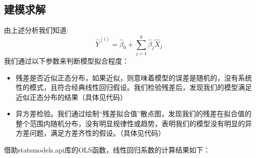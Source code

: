 \documentclass[UTF8, zihao=-4]{ctexart}
\begin{document}
	\subsection{建模求解}
		由上述分析我们知道:
		\[
		\hat{Y}^{(i)} = \hat{\beta}_0 + \sum_{j=1}^{8}\hat{\beta}_j\hat{X}_j
		\]
		我们通过以下参数来判断模型拟合程度：
		\begin{itemize}
			\item 残差是否近似正态分布，如果近似，则意味着模型的误差是随机的，没有系统性的模式，且符合经典线性回归假设。我们检验残差后，发现我们的模型满足近似正态分布的结果（具体见代码）
			\item 异方差检验。我们通过绘制“残差拟合值”散点图，发现我们的残差在拟合值的整个范围内随机分布，没有明显规律性或趋势，表明我们的模型没有明显的异方差问题，满足方差齐性的假设。（具体见代码）
		\end{itemize}
		借助statsmodels.api库的OLS函数，线性回归系数的计算结果如下：
\end{document}
